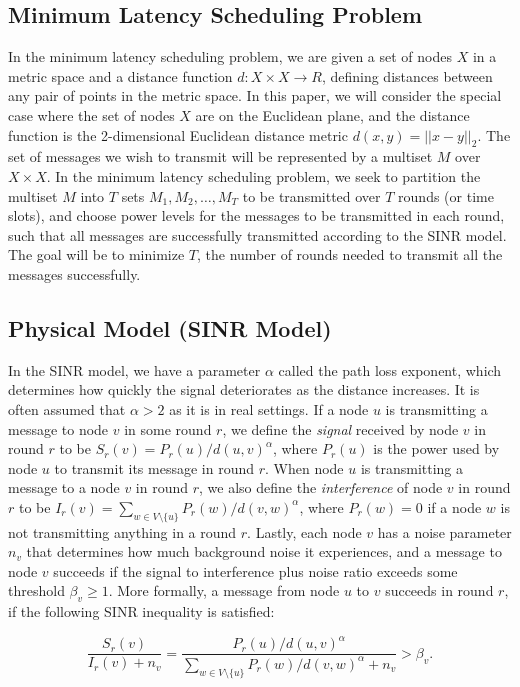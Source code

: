 \documentclass{article}
\begin{document}
\subsection{Minimum Latency Scheduling Problem}
In the minimum latency scheduling problem, we are given a set of nodes $X$ in a metric space and a distance function $d: X \times X \to R$, defining distances between any pair of points in the metric space.  In this paper, we will consider the special case where the set of nodes $X$ are on the Euclidean plane, and the distance function is the 2-dimensional Euclidean distance metric $d( x, y ) = || x -  y ||_2$.  The set of messages we wish to transmit will be represented by a multiset $M$ over $X \times X$.  In the minimum latency scheduling problem, we seek to partition the multiset $M$ into $T$ sets $M_1, M_2, \dots, M_T$ to be transmitted over $T$ rounds (or time slots), and choose power levels for the messages to be transmitted in each round, such that all messages are successfully transmitted according to the SINR model.  The goal will be to minimize $T$, the number of rounds needed to transmit all the messages successfully.

\subsection{Physical Model (SINR Model)}
In the SINR model, we have a parameter $\alpha$ called the path loss exponent, which determines how quickly the signal deteriorates as the distance increases. It is often assumed that $\alpha > 2$ as it is in real settings.  If a node $u$ is transmitting a message to node $v$ in some round $r$, we define the \emph{signal} received by node $v$ in round $r$ to be $S_r(v) = P_r(u)/d(u,v)^\alpha$, where $P_r(u)$ is the power used by node $u$ to transmit its message in round $r$.  When node $u$ is transmitting a message to a node $v$ in round $r$, we also define the \emph{interference} of node $v$ in round $r$ to be $I_r(v) = \sum_{w \in V \setminus \{ u \} } P_r(w)/d(v,w)^\alpha$, where $P_r(w) = 0$ if a node $w$ is not transmitting anything in a round $r$.  Lastly, each node $v$ has a noise parameter $n_v$ that determines how much background noise it experiences, and a message to node $v$ succeeds if the signal to interference plus noise ratio exceeds some threshold $\beta_v \geq 1$.  More formally, a message from node $u$ to $v$ succeeds in round $r$, if the following SINR inequality is satisfied:

\[ \frac{S_r(v)}{I_r(v) + n_v} = \frac{P_r(u)/d(u,v)^\alpha}{\sum_{w \in V \setminus \{ u \} } P_r(w)/d(v,w)^\alpha + n_v} > \beta_v. \]
\end{document}
